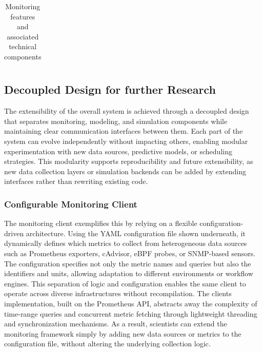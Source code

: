 \begin{table}[H]
{\begin{tabular}{
            p{4.5cm}
            >{\centering\arraybackslash}p{2.8cm}
            p{8.2cm}
            }
            \bottomrule
        \end{tabular}
    }
    \small
    \caption{Monitoring features and associated technical components}
    \label{tab:monitoring_layers}
\end{table}


\subsection{Decoupled Design for further Research}
\label{sec:extensibility_through_decoupled_design}
The extensibility of the overall system is achieved through a decoupled design that separates monitoring, modeling, and simulation components while maintaining clear communication interfaces between them. Each part of the system can evolve independently without impacting others, enabling modular experimentation with new data sources, predictive models, or scheduling strategies. This modularity supports reproducibility and future extensibility, as new data collection layers or simulation backends can be added by extending interfaces rather than rewriting existing code.

\subsubsection{Configurable Monitoring Client}
\label{sec:monitoring_client}
The monitoring client exemplifies this by relying on a flexible configuration-driven architecture. Using the YAML configuration file shown underneath, it dynamically defines which metrics to collect from heterogeneous data sources such as Prometheus exporters, cAdvisor, eBPF probes, or SNMP-based sensors. The configuration specifies not only the metric names and queries but also the identifiers and units, allowing adaptation to different environments or workflow engines. This separation of logic and configuration enables the same client to operate across diverse infrastructures without recompilation. The clients implementation, built on the Prometheus API, abstracts away the complexity of time-range queries and concurrent metric fetching through lightweight threading and synchronization mechanisms. As a result, scientists can extend the monitoring framework simply by adding new data sources or metrics to the configuration file, without altering the underlying collection logic.

% 

